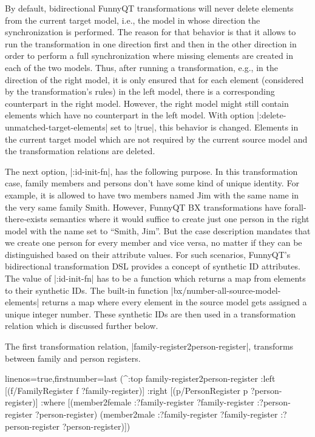 \documentclass[a4paper]{article}
\newcommand{\code}{\clojureinline}
\begin{document}
By default, bidirectional FunnyQT transformations will never delete elements
from the current target model, i.e., the model in whose direction the
synchronization is performed.  The reason for that behavior is that it allows
to run the transformation in one direction first and then in the other
direction in order to perform a full synchronization where missing elements are
created in each of the two models.  Thus, after running a transformation, e.g.,
in the direction of the right model, it is only ensured that for each element
(considered by the transformation's rules) in the left model, there is a
corresponding counterpart in the right model.  However, the right model might
still contain elements which have no counterpart in the left model.  With
option \code|:delete-unmatched-target-elements| set to \code|true|, this
behavior is changed.  Elements in the current target model which are not
required by the current source model and the transformation relations are
deleted.

The next option, \code|:id-init-fn|, has the following purpose.  In this
transformation case, family members and persons don't have some kind of unique
identity.  For example, it is allowed to have two members named Jim with the
same name in the very same family Smith.  However, FunnyQT BX transformations
have forall-there-exists semantics where it would suffice to create just one
person in the right model with the name set to ``Smith, Jim''.  But the case
description mandates that we create one person for every member and vice versa,
no matter if they can be distinguished based on their attribute values.  For
such scenarios, FunnyQT's bidirectional transformation DSL provides a concept
of synthetic ID attributes.  The value of \code|:id-init-fn| has to be a
function which returns a map from elements to their synthetic IDs.  The
built-in function \code|bx/number-all-source-model-elements| returns a map
where every element in the source model gets assigned a unique integer number.
These synthetic IDs are then used in a transformation relation which is
discussed further below.

The first transformation relation, \code|family-register2person-register|,
transforms between family and person registers.

\begin{clojurecode*}{linenos=true,firstnumber=last}
  (^:top family-register2person-register
   :left  [(f/FamilyRegister f ?family-register)]
   :right [(p/PersonRegister p ?person-register)]
   :where [(member2female :?family-register ?family-register :?person-register ?person-register)
           (member2male :?family-register ?family-register :?person-register ?person-register)])
\end{clojurecode*}
\end{document}
